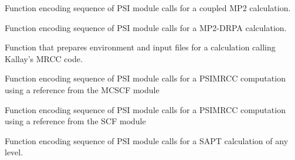 \documentclass[letterpaper,10pt,english]{sphinxmanual}
\begin{document}
\begin{fulllineitems}
\label{index:proc.run_mp2c}
Function encoding sequence of PSI module calls for
a coupled MP2 calculation.

\end{fulllineitems}


\begin{fulllineitems}
\label{index:proc.run_mp2drpa}
Function encoding sequence of PSI module calls for
a MP2-DRPA calculation.

\end{fulllineitems}


\begin{fulllineitems}
\label{index:proc.run_mrcc}
Function that prepares environment and input files
for a calculation calling Kallay's MRCC code.

\end{fulllineitems}


\begin{fulllineitems}
\label{index:proc.run_psimrcc}
Function encoding sequence of PSI module calls for a PSIMRCC computation
using a reference from the MCSCF module

\end{fulllineitems}


\begin{fulllineitems}
\label{index:proc.run_psimrcc_scf}
Function encoding sequence of PSI module calls for a PSIMRCC computation
using a reference from the SCF module

\end{fulllineitems}


\begin{fulllineitems}
\label{index:proc.run_sapt}
Function encoding sequence of PSI module calls for
a SAPT calculation of any level.

\end{fulllineitems}
\end{document}
